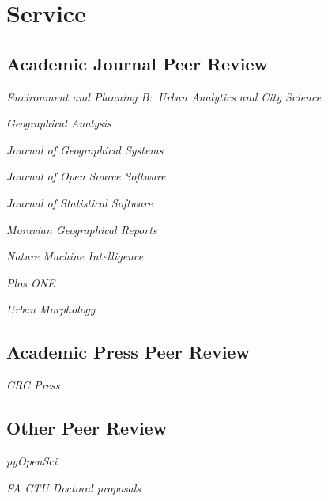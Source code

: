 \documentclass[12pt,a4paper]{report}
\newcommand{\listitemspace}{0.25em}
\renewenvironment{itemize}
{\begin{list}{}{\setlength{\leftmargin}{0em}
                \setlength{\parskip}{0em}
                \setlength{\itemsep}{\listitemspace}
                \setlength{\parsep}{\listitemspace}}}
{\end{list}}
\begin{document}
    \section*{Service}

    \subsection*{Academic Journal Peer Review}

    \begin{itemize}

        \item \textit{Environment and Planning B:\ Urban Analytics and City Science}
        \item \textit{Geographical Analysis}
        \item \textit{Journal of Geographical Systems}
        \item \textit{Journal of Open Source Software}
        \item \textit{Journal of Statistical Software}
        \item \textit{Moravian Geographical Reports}
        \item \textit{Nature Machine Intelligence}
        \item \textit{Plos ONE}
        \item \textit{Urban Morphology}

    \end{itemize}

    \subsection*{Academic Press Peer Review}

    \begin{itemize}

        \item \textit{CRC Press}

    \end{itemize}

    \subsection*{Other Peer Review}

    \begin{itemize}

        \item \textit{pyOpenSci}
        \item \textit{FA CTU Doctoral proposals}

    \end{itemize}
\end{document}
